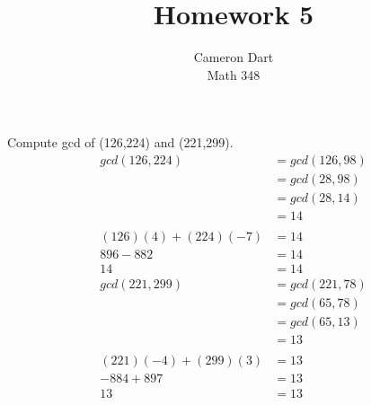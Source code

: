 \documentclass[12pt]{article}
\newenvironment{question}[2][Question]{\begin{trivlist}
\item[\hskip \labelsep {\bfseries #1}\hskip \labelsep {\bfseries #2.}]}{\end{trivlist}}
\begin{document}
  
\title{Homework 5}
\author{Cameron Dart\\ 
Math 348} 
 
\maketitle

\begin{question}{6.8}
Compute gcd of (126,224) and (221,299).\\
\begin{align}
gcd(126,224) &= gcd(126,98)\\ 
&= gcd(28,98) \\
&= gcd(28,14) \\
&= 14 \\
\\ 
(126)(4) + (224)(-7) &= 14\\
896 - 882 &= 14\\
14 &= 14
\end{align}
\begin{align}
gcd(221,299) &= gcd(221,78)\\ 
&= gcd(65,78) \\
&= gcd(65,13) \\
&= 13 \\
\\ 
(221)(-4)+(299)(3)&= 13\\
-884+897 &=13\\
13 &= 13\\
\end{align}
\end{question}
%
\end{document}
